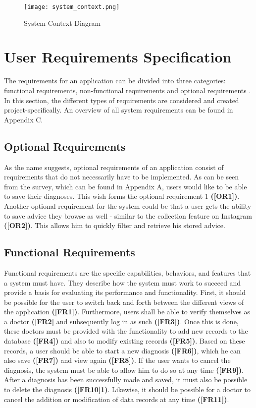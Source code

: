 \begin{figure}[H]
	\centering
	\texttt{[image: system\_context.png]}
	\caption[System Context Diagram ]{System Context Diagram}
\end{figure}

\section{User Requirements Specification}
The requirements for an application can be divided into three categories: functional requirements, non-functional requirements and optional requirements \cite[p. 51 ff.]{.req2} \cite{.req}. In this section, the different types of requirements are considered and created project-specifically. An overview of all system requirements can be found in Appendix C. 

\subsection{Optional Requirements}
As the name suggests, optional requirements of an application consist of requirements that do not necessarily have to be implemented. As can be seen from the survey, which can be found in Appendix A, users would like to be able to save their diagnoses. This wish forms the optional requirement 1  \textbf{([OR1])}. Another optional requirement for the system could be that a user gets the ability to save advice they browse as well - similar to the collection feature on Instagram \textbf{([OR2])}. This allows him to quickly filter and retrieve his stored advice.

\subsection{Functional Requirements}
Functional requirements are the specific capabilities, behaviors, and features that a system must have. They describe how the system must work to succeed and provide a basis for evaluating its performance and functionality. First, it should be possible for the user to switch back and forth between the different views of the application \textbf{([FR1])}.  Furthermore, users shall be able to verify themselves as a doctor \textbf{([FR2]} and subsequently log in as such \textbf{([FR3])}. Once this is done, these doctors must be provided with the functionality to add new records to the database \textbf{([FR4])} and also to modify existing records \textbf{([FR5])}.  Based on these records, a user should be able to start a new diagnosis \textbf{([FR6])}, which he can also save \textbf{([FR7])} and view again \textbf{([FR8])}. If the user wants to cancel the diagnosis, the system must be able to allow him to do so at any time \textbf{([FR9])}.  After a diagnosis has been successfully made and saved, it must also be possible to delete the diagnosis \textbf{([FR10]1)}. Likewise, it should be possible for a doctor to cancel the addition or modification of data records at any time \textbf{([FR11])}. 


